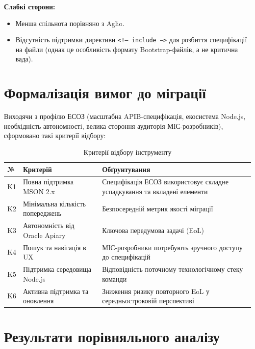 \documentclass{article}
\begin{document}
\textbf{Слабкі сторони:}
\begin{itemize}
\item Менша спільнота порівняно з Aglio.
\item Відсутність підтримки директиви \texttt{<!-- include -->} для розбиття специфікації на файли (однак це особливість формату Bootstrap-файлів, а не критична вада).
\end{itemize}

\section{Формалізація вимог до міграції}
Виходячи з профілю ЕСОЗ (масштабна APIB-специфікація, екосистема Node.js, необхідність автономності, велика стороння аудиторія МІС-розробників), сформовано такі критерії відбору:

\begin{table}[htbp]
\centering
\caption{Критерії відбору інструменту}
\footnotesize
\begin{tabular}{@{} l p{5.0cm} p{8.5cm} @{}}
\toprule
\textbf{№} & \textbf{Критерій} & \textbf{Обґрунтування} \\
\midrule
K1 & Повна підтримка MSON 2.x & Специфікація ЕСОЗ використовує складне успадкування та вкладені елементи \\
K2 & Мінімальна кількість попереджень & Безпосередній метрик якості міграції \\
K3 & Автономність від Oracle Apiary & Ключова передумова задачі (EoL) \\
K4 & Пошук та навігація в UX & МІС-розробники потребують зручного доступу до специфікацій \\
K5 & Підтримка середовища Node.js & Відповідність поточному технологічному стеку команди \\
K6 & Активна підтримка та оновлення & Зниження ризику повторного EoL у середньостроковій перспективі \\
\bottomrule
\end{tabular}
\end{table}

\section{Результати порівняльного аналізу}
\end{document}
